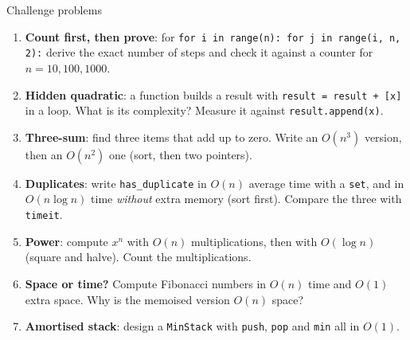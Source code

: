\documentclass[aspectratio=169,10pt]{beamer}
\begin{document}
\begin{frame}{Challenge problems}
\small
\begin{enumerate}\setlength\itemsep{3pt}
\item \textbf{Count first, then prove}: for \texttt{for i in range(n): for j in range(i, n, 2):} derive the exact number of steps and check it against a counter for $n=10,100,1000$.
\item \textbf{Hidden quadratic}: a function builds a result with \texttt{result = result + [x]} in a loop. What is its complexity? Measure it against \texttt{result.append(x)}.
\item \textbf{Three-sum}: find three items that add up to zero. Write an $O(n^3)$ version, then an $O(n^2)$ one (sort, then two pointers).
\item \textbf{Duplicates}: write \texttt{has\_duplicate} in $O(n)$ average time with a \texttt{set}, and in $O(n\log n)$ time \emph{without} extra memory (sort first). Compare the three with \texttt{timeit}.
\item \textbf{Power}: compute $x^n$ with $O(n)$ multiplications, then with $O(\log n)$ (square and halve). Count the multiplications.
\item \textbf{Space or time?} Compute Fibonacci numbers in $O(n)$ time and $O(1)$ extra space. Why is the memoised version $O(n)$ space?
\item \textbf{Amortised stack}: design a \texttt{MinStack} with \texttt{push}, \texttt{pop} and \texttt{min} all in $O(1)$.
\end{enumerate}
\end{frame}
\end{document}
